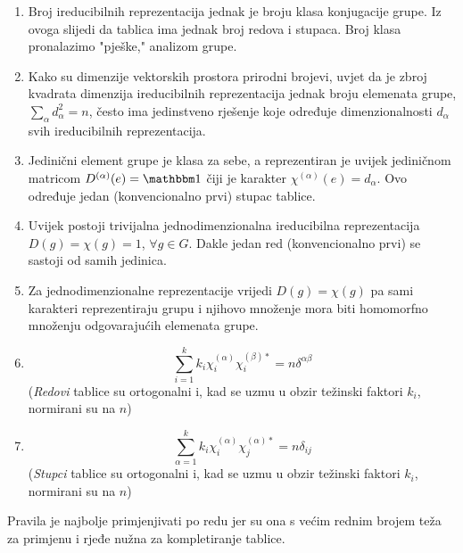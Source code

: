 \begin{enumerate}

\item Broj ireducibilnih reprezentacija jednak je broju klasa konjugacije 
  grupe. Iz ovoga slijedi da tablica ima jednak broj redova i stupaca. 
  Broj klasa pronalazimo "pješke," analizom grupe.  

\item Kako su dimenzije vektorskih prostora prirodni brojevi,
    uvjet da je zbroj kvadrata dimenzija ireducibilnih reprezentacija
    jednak broju elemenata grupe, $\sum_{\alpha} d_{\alpha}^2 = n$, često ima jedinstveno rješenje koje
    određuje dimenzionalnosti $d_{\alpha}$ svih ireducibilnih reprezentacija.

\item Jedinični element grupe je klasa za sebe, a reprezentiran je uvijek
  jediničnom matricom $D^{(\alpha)}(e)=\Eins$ čiji je 
   karakter $\chi^{(\alpha)}(e)=d_{\alpha}$.
  Ovo određuje jedan (konvencionalno prvi) stupac tablice.

\item Uvijek postoji trivijalna jednodimenzionalna ireducibilna
   reprezentacija  $D(g)=\chi(g)=1$, $\forall g\in G$.
  Dakle jedan red (konvencionalno prvi) se sastoji od samih jedinica.

\item Za jednodimenzionalne reprezentacije vrijedi $D(g)=\chi(g)$ pa
  sami karakteri reprezentiraju grupu i njihovo množenje mora biti
  homomorfno množenju odgovarajućih elemenata grupe.

\item  \[\sum_{i=1}^{k} k_{i} \chi^{(\alpha)}_{i} \chi^{(\beta) *}_{i} =
    n \delta^{\alpha\beta}\] 
(\emph{Redovi} tablice su ortogonalni i, kad se uzmu u obzir težinski
  faktori $k_i$, normirani su na $n$)

\item  \[\sum_{\alpha=1}^{k} k_{i} \chi^{(\alpha)}_{i} \chi^{(\alpha) *}_{j} =
    n \delta_{ij} \] 
(\emph{Stupci} tablice su ortogonalni i, kad se uzmu u obzir težinski
  faktori $k_i$, normirani su na $n$)

\end{enumerate}

Pravila je najbolje primjenjivati po redu jer su ona s većim rednim
brojem teža za primjenu i rjeđe nužna za kompletiranje tablice.

